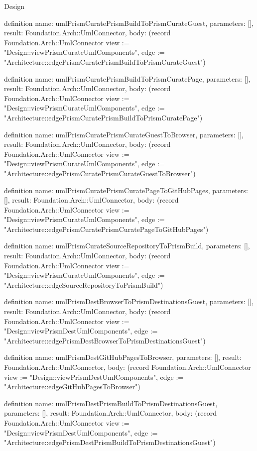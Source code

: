 \begin{lexlean}{Design}
\begin{semanticmodule}
definition{
  name: umlPrismCuratePrismBuildToPrismCurateGuest,
  parameters: [],
  result: Foundation.Arch::UmlConnector,
  body: (record Foundation.Arch::UmlConnector {view := "Design::viewPrismCurateUmlComponents", edge := "Architecture::edgePrismCuratePrismBuildToPrismCurateGuest"})
}

definition{
  name: umlPrismCuratePrismBuildToPrismCuratePage,
  parameters: [],
  result: Foundation.Arch::UmlConnector,
  body: (record Foundation.Arch::UmlConnector {view := "Design::viewPrismCurateUmlComponents", edge := "Architecture::edgePrismCuratePrismBuildToPrismCuratePage"})
}

definition{
  name: umlPrismCuratePrismCurateGuestToBrowser,
  parameters: [],
  result: Foundation.Arch::UmlConnector,
  body: (record Foundation.Arch::UmlConnector {view := "Design::viewPrismCurateUmlComponents", edge := "Architecture::edgePrismCuratePrismCurateGuestToBrowser"})
}

definition{
  name: umlPrismCuratePrismCuratePageToGitHubPages,
  parameters: [],
  result: Foundation.Arch::UmlConnector,
  body: (record Foundation.Arch::UmlConnector {view := "Design::viewPrismCurateUmlComponents", edge := "Architecture::edgePrismCuratePrismCuratePageToGitHubPages"})
}

definition{
  name: umlPrismCurateSourceRepositoryToPrismBuild,
  parameters: [],
  result: Foundation.Arch::UmlConnector,
  body: (record Foundation.Arch::UmlConnector {view := "Design::viewPrismCurateUmlComponents", edge := "Architecture::edgeSourceRepositoryToPrismBuild"})
}

definition{
  name: umlPrismDestBrowserToPrismDestinationsGuest,
  parameters: [],
  result: Foundation.Arch::UmlConnector,
  body: (record Foundation.Arch::UmlConnector {view := "Design::viewPrismDestUmlComponents", edge := "Architecture::edgePrismDestBrowserToPrismDestinationsGuest"})
}

definition{
  name: umlPrismDestGitHubPagesToBrowser,
  parameters: [],
  result: Foundation.Arch::UmlConnector,
  body: (record Foundation.Arch::UmlConnector {view := "Design::viewPrismDestUmlComponents", edge := "Architecture::edgeGitHubPagesToBrowser"})
}

definition{
  name: umlPrismDestPrismBuildToPrismDestinationsGuest,
  parameters: [],
  result: Foundation.Arch::UmlConnector,
  body: (record Foundation.Arch::UmlConnector {view := "Design::viewPrismDestUmlComponents", edge := "Architecture::edgePrismDestPrismBuildToPrismDestinationsGuest"})
}


\end{semanticmodule}
\end{lexlean}
